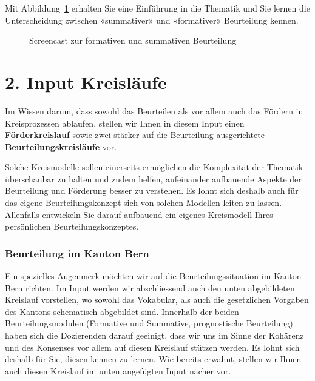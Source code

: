 \documentclass[
  10pt,
  a4paper,
  DIV=11]{scrartcl}
\begin{document}
Mit Abbildung~\ref{fig-screencast} erhalten Sie eine Einführung in die
Thematik und Sie lernen die Unterscheidung zwischen «summativer» und
«formativer» Beurteilung kennen.

\begin{figure}

\centering{

}

\caption{\label{fig-screencast}Screencast zur formativen und summativen
Beurteilung}

\end{figure}%

\section{2. Input Kreisläufe}\label{input-kreisluxe4ufe}

Im Wissen darum, dass sowohl das Beurteilen als vor allem auch das
Fördern in Kreisprozessen ablaufen, stellen wir Ihnen in diesem Input
einen \textbf{Förderkreislauf} sowie zwei stärker auf die Beurteilung
ausgerichtete \textbf{Beurteilungskreisläufe} vor.

Solche Kreismodelle sollen einerseits ermöglichen die Komplexität der
Thematik überschaubar zu halten und zudem helfen, aufeinander aufbauende
Aspekte der Beurteilung und Förderung besser zu verstehen. Es lohnt sich
deshalb auch für das eigene Beurteilungskonzept sich von solchen
Modellen leiten zu lassen. Allenfalls entwickeln Sie darauf aufbauend
ein eigenes Kreismodell Ihres persönlichen Beurteilungskonzeptes.

\subsubsection{Beurteilung im Kanton
Bern}\label{beurteilung-im-kanton-bern}

Ein spezielles Augenmerk möchten wir auf die Beurteilungssituation im
Kanton Bern richten. Im Input werden wir abschliessend auch den unten
abgebildeten Kreislauf vorstellen, wo sowohl das Vokabular, als auch die
gesetzlichen Vorgaben des Kantons schematisch abgebildet sind. Innerhalb
der beiden Beurteilungsmodulen (Formative und Summative, prognostische
Beurteilung) haben sich die Dozierenden darauf geeinigt, dass wir uns im
Sinne der Kohärenz und des Konsenses vor allem auf diesen Kreislauf
stützen werden. Es lohnt sich deshalb für Sie, diesen kennen zu lernen.
Wie bereits erwähnt, stellen wir Ihnen auch diesen Kreislauf im unten
angefügten Input nächer vor.
\end{document}
